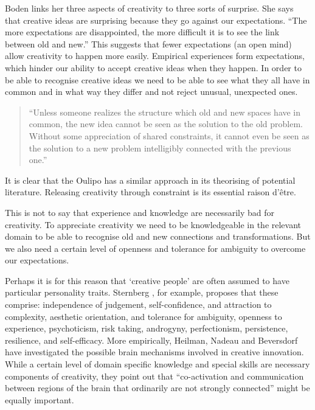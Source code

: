 \begin{leftbar}
Boden links her three aspects of creativity to three sorts of surprise. She says that creative ideas are surprising because they go against our expectations. ``The more expectations are disappointed, the more difficult it is to see the link between old and new.'' \autocite[p.84]{Boden2003} This suggests that fewer expectations (an open mind) allow creativity to happen more easily. Empirical experiences form expectations, which hinder our ability to accept creative ideas when they happen. In order to be able to recognise creative ideas we need to be able to see what they all have in common and in what way they differ and not reject unusual, unexpected ones.
\end{leftbar}

\begin{quote}
  ``Unless someone realizes the structure which old and new spaces have in common, the new idea cannot be seen as the solution to the old problem. Without some appreciation of shared constraints, it cannot even be seen as the solution to a new problem intelligibly connected with the previous one.'' \autocite[p.84]{Boden2003}
\end{quote}

\begin{leftbar}
It is clear that the Oulipo has a similar approach in its theorising of potential literature. Releasing creativity through constraint is its essential raison d'être.
\end{leftbar}

\begin{leftbar}
This is not to say that experience and knowledge are necessarily bad for creativity. To appreciate creativity we need to be knowledgeable in the relevant domain to be able to recognise old and new connections and transformations. But we also need a certain level of openness and tolerance for ambiguity to overcome our expectations.
\end{leftbar}

\begin{leftbar}
Perhaps it is for this reason that `creative people' are often assumed to have particular personality traits. Sternberg \autocite{Sternberg1999, Sternberg1999}, for example, proposes that these comprise: independence of judgement, self-confidence, and attraction to complexity, aesthetic orientation, and tolerance for ambiguity, openness to experience, psychoticism, risk taking, androgyny, perfectionism, persistence, resilience, and self-efficacy. More empirically, Heilman, Nadeau and Beversdorf \autocite{Heilman2003} have investigated the possible brain mechanisms involved in creative innovation. While a certain level of domain specific knowledge and special skills are necessary components of creativity, they point out that ``co-activation and communication between regions of the brain that ordinarily are not strongly connected'' might be equally important.
\end{leftbar}

